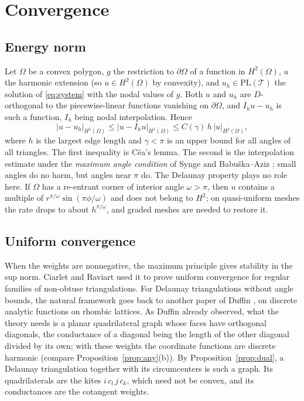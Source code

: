 \documentclass[11pt]{amsart}
\theoremstyle{definition}
\theoremstyle{remark}
\newcommand{\cT}{\mathcal{T}}
\newcommand{\PL}{\mathrm{PL}}
\begin{document}
\section{Convergence}\label{sec:conv}

\subsection{Energy norm}
Let $\Omega$ be a convex polygon, $g$ the restriction to $\partial\Omega$ of a function in $H^2(\Omega)$, $u$ the harmonic extension (so $u\in H^2(\Omega)$ by convexity),
and $u_h\in\PL(\cT)$ the solution of \eqref{eq:system} with the nodal values of $g$. Both $u$ and $u_h$ are $D$-orthogonal to the piecewise-linear functions vanishing on
$\partial\Omega$, and $I_hu-u_h$ is such a function, $I_h$ being nodal interpolation. Hence
\begin{equation}\label{eq:cea}
|u-u_h|_{H^1(\Omega)}\le|u-I_hu|_{H^1(\Omega)}\le C(\gamma)\,h\,|u|_{H^2(\Omega)},
\end{equation}
where $h$ is the largest edge length and $\gamma<\pi$ is an upper bound for all angles of all triangles. The first inequality is C\'ea's lemma.
The second is the interpolation estimate under the \emph{maximum angle condition} of Synge and Babu\v{s}ka--Aziz \cite{BA76}; small angles do no harm, but angles near $\pi$ do.
The Delaunay property plays no role here. If $\Omega$ has a re-entrant corner of interior angle $\omega>\pi$, then $u$ contains a multiple of $r^{\pi/\omega}\sin(\pi\phi/\omega)$ and does not belong to $H^2$;
on quasi-uniform meshes the rate drops to about $h^{\pi/\omega}$, and graded meshes are needed to restore it.

\subsection{Uniform convergence}
When the weights are nonnegative, the maximum principle gives stability in the sup norm. Ciarlet and Raviart \cite{CR73} used it to prove uniform convergence for regular families of
non-obtuse triangulations. For Delaunay triangulations without angle bounds, the natural framework goes back to another paper of Duffin \cite{Duf68}, on discrete analytic functions on rhombic lattices. As Duffin already observed, what the theory needs is a planar
quadrilateral graph whose faces have orthogonal diagonals, the conductance of a diagonal being the length of the other diagonal divided by its own; with these weights the coordinate functions are discrete harmonic (compare Proposition~\ref{prop:any}(b)).
By Proposition~\ref{prop:dual}, a Delaunay triangulation together with its circumcenters is such a graph. Its quadrilaterals are the kites $i\,c_l\,j\,c_k$,
which need not be convex, and its conductances are the cotangent weights.
\end{document}
